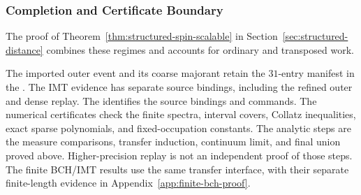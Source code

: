 \subsubsection{Completion and Certificate Boundary}

The proof of Theorem~\ref{thm:structured-spin-scalable} in
Section~\ref{sec:structured-distance} combines these regimes and accounts
for ordinary and transposed work.

The imported outer event and its coarse majorant retain the $31$-entry
manifest in the
.
The IMT evidence has separate source bindings, including the refined
outer and dense replay.
The 
identifies the source bindings and commands. The numerical certificates check
the finite spectra, interval covers, Collatz inequalities, exact sparse
polynomials, and fixed-occupation constants. The analytic steps are the
measure comparisons, transfer induction, continuum limit, and final union
proved above. Higher-precision replay is not an independent proof of those
steps. The finite BCH/IMT results use the same transfer interface, with
their separate finite-length evidence in
Appendix~\ref{app:finite-bch-proof}.
